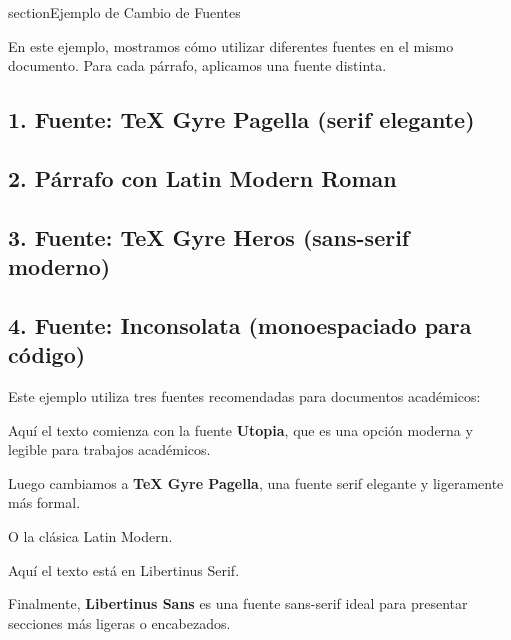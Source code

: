 \documentclass[12pt]{article}
\begin{document}
{\color{blue}\lipsum[4]}

{\color{red}\lipsum[4]}


section{Ejemplo de Cambio de Fuentes}

En este ejemplo, mostramos cómo utilizar diferentes fuentes en el mismo documento. Para cada párrafo, aplicamos una fuente distinta.

\subsection*{1. Fuente: TeX Gyre Pagella (serif elegante)}
{ \selectfont
\lipsum[1]
}

\subsection*{2. Párrafo con Latin Modern Roman}
{\selectfont
\lipsum[2]
}

\subsection*{3. Fuente: TeX Gyre Heros (sans-serif moderno)}
{\sffamily 
\lipsum[2]
}

\subsection*{4. Fuente: Inconsolata (monoespaciado para código)}
{\ttfamily 
\lipsum[3]
}

\vspace{2mm}

Este ejemplo utiliza tres fuentes recomendadas para documentos académicos:

\color{teal}

{\selectfont   Aquí el texto comienza con la fuente \textbf{Utopia}, que es una opción moderna y legible para trabajos académicos. }

{\selectfont Luego cambiamos a \textbf{TeX Gyre Pagella}, una fuente serif elegante y ligeramente más formal. \lipsum[1]} 

 {\selectfont O la clásica Latin Modern. \lipsum[1] } 

{\selectfont Aquí el texto está en Libertinus Serif.}


Finalmente, {\sffamily \textbf{Libertinus Sans}} es una fuente sans-serif ideal para presentar secciones más ligeras o encabezados.
\end{document}
